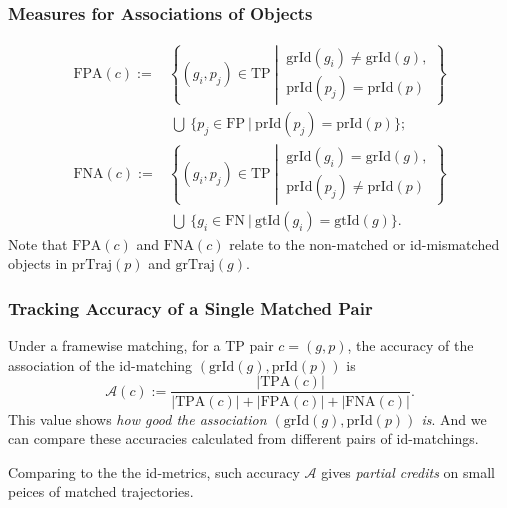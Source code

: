 \documentclass[slidetop, mathserif, dvipsnames]{beamer}
\begin{document}
\begin{frame}
	\frametitle{Measures for Associations of Objects}
			
	\vspace{-20pt}
	\begin{align*}
		\text{FPA}(c) := &             
		\left\{(g_i, p_j)\in\text{TP}\ \left|\ 
		\begin{array}{c}
		\text{grId}(g_i) \neq \text{grId}(g), \\
		\text{prId}(p_j) = \text{prId}(p)
		\end{array}\right.
		\right\} \\
		                 & ~ \bigcup ~ 
		\Big\{p_j\in\text{FP}\ |\ 
		\text{prId}(p_j) = \text{prId}(p)
		\Big\}; \\
		\text{FNA}(c) := &             
		\left\{(g_i, p_j)\in\text{TP}\ \left|\ 
		\begin{array}{c}
		\text{grId}(g_i) = \text{grId}(g), \\
		\text{prId}(p_j) \neq \text{prId}(p)
		\end{array}\right.
		\right\} \\
		                 & ~ \bigcup ~ 
		\Big\{g_i\in\text{FN}\ |\ 
		\text{gtId}(g_i) = \text{gtId}(g)
		\Big\}.
	\end{align*}
	Note that $\text{FPA}(c)$ and $\text{FNA}(c)$ relate to the non-matched
	or id-mismatched objects in $\text{prTraj}(p)$ and $\text{grTraj}(g)$.
			
\end{frame}

\begin{frame}
	\frametitle{Tracking Accuracy of a Single Matched Pair}

	Under a framewise matching, for a TP pair $c=(g,p)$,
	the accuracy of the association of the id-matching $(\text{grId}(g), \text{prId}(p))$
	is
	\[
		\mathcal A(c) := 
		\dfrac{|\text{TPA}(c)|}{|\text{TPA}(c)|+|\text{FPA}(c)|+|\text{FNA}(c)|}.
	\]
	This value shows
	\emph{how good the association $(\text{grId}(g), \text{prId}(p))$ is}.
	And we can compare these accuracies calculated from different pairs
	of id-matchings.

	\vspace{5pt}

	Comparing to the the id-metrics, such accuracy $\mathcal A$ gives
	\emph{partial credits} on small peices of matched trajectories.

\end{frame}
\end{document}
